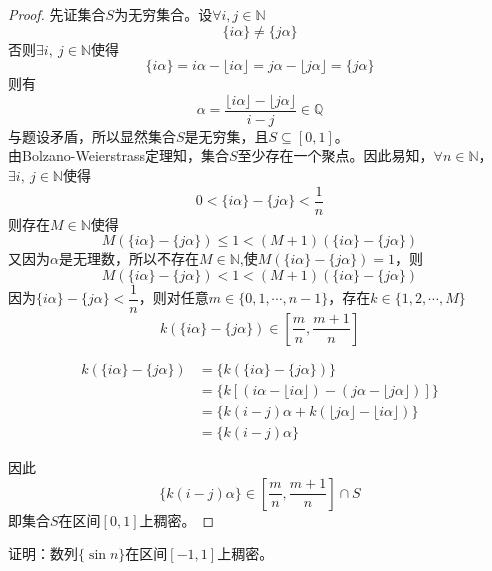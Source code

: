 \begin{proof}

    先证集合$S$为无穷集合。设$\forall i,j \in \mathbb{N}$
    $$\{i\alpha\} \neq \{j\alpha\}$$
    否则$\exists i,\ j \in \mathbb{N}$使得
    $$\{i\alpha\} = i\alpha - \lfloor i\alpha \rfloor = j\alpha - \lfloor j\alpha \rfloor = \{j\alpha\}$$
    则有
    $$\alpha = \dfrac{\lfloor i\alpha \rfloor - \lfloor j\alpha \rfloor}{i - j} \in \mathbb{Q}$$
    与题设矛盾，所以显然集合$S$是无穷集，且$S \subseteq [0,1]$。\\
    由\textup{Bolzano-Weierstrass}定理知，集合$S$至少存在一个聚点。因此易知，$\forall n \in \mathbb{N}$，$\exists i,\ j \in \mathbb{N}$使得
    $$0 < \{i\alpha\} - \{j\alpha\} < \dfrac{1}{n}$$
    则存在$M \in \mathbb{N}$使得
    $$M(\{i\alpha\} - \{j\alpha\}) \leq 1 < (M + 1)(\{i\alpha\} - \{j\alpha\})$$
    又因为$\alpha$是无理数，所以不存在$M \in \mathbb{N}$,使$M(\{i\alpha\} - \{j\alpha\}) = 1$，则
    $$M(\{i\alpha\} - \{j\alpha\}) < 1 < (M + 1)(\{i\alpha\} - \{j\alpha\})$$
    因为$\{i\alpha\} - \{j\alpha\} < \dfrac{1}{n}$，则对任意$m \in \{0, 1, \cdots, n - 1\}$，存在$k \in \{1, 2, \cdots, M\}$
    $$k(\{i\alpha\} - \{j\alpha\}) \in \left[\dfrac{m}{n}, \dfrac{m + 1}{n}\right]$$

    \begin{align*}
        k (\{ i \alpha \} - \{ j \alpha \}) & = \{ k (\{ i \alpha \} - \{ j \alpha \}) \} \\
        & = \{ k [(i \alpha - \lfloor i \alpha \rfloor) - (j \alpha - \lfloor j \alpha \rfloor)] \} \\
        & = \{ k (i - j) \alpha + k (\lfloor j \alpha \rfloor - \lfloor i \alpha \rfloor) \} \\
        & = \{ k (i - j) \alpha \}
    \end{align*}

    因此
    $$\{ k (i - j) \alpha \} \in \! \left[ \dfrac{m}{n},\dfrac{m + 1}{n} \right] \cap S$$
    即集合$S$在区间$[0,1]$上稠密。

\end{proof}

\begin{proposition}

    证明：数列$\{\sin n\}$在区间$[-1,1]$上稠密。

\end{proposition}

